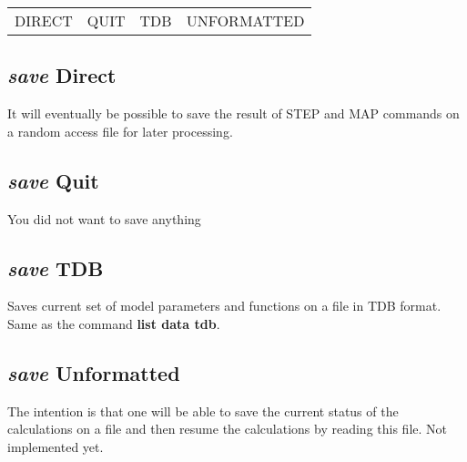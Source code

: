 \documentclass[12pt]{article}
\begin{document}
\begin{tabular}{llll}
 DIRECT          & QUIT    & TDB &         UNFORMATTED\\
\end{tabular}

\subsection{{\em save} Direct}

It will eventually be possible to save the result of STEP and MAP
commands on a random access file for later processing.

\subsection{{\em save} Quit}

You did not want to save anything

\subsection{{\em save} TDB}

Saves current set of model parameters and functions on a file in TDB
format.  Same as the command {\bf list data tdb}.

\subsection{{\em save} Unformatted}

The intention is that one will be able to save the current status of
the calculations on a file and then resume the calculations by
reading this file.  Not implemented yet.
\end{document}
